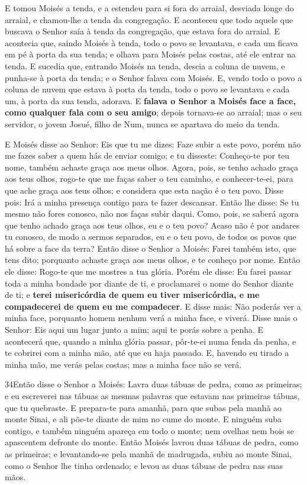 E tomou Moisés a tenda, e a estendeu para si fora do arraial,
desviada longe do arraial, e chamou-lhe a tenda da congregação. E
aconteceu que todo aquele que buscava o Senhor saía à tenda da
congregação, que estava fora do arraial. E acontecia que, saindo
Moisés à tenda, todo o povo se levantava, e cada um ficava em pé à
porta da sua tenda; e olhava para Moisés pelas costas, até ele
entrar na tenda. E sucedia que, entrando Moisés na tenda, descia
a coluna de nuvem, e punha-se à porta da tenda; e o Senhor falava
com Moisés. E, vendo todo o povo a coluna de nuvem que estava
à porta da tenda, todo o povo se levantava e cada um, à porta da sua
tenda, adorava. E \textbf{falava o Senhor a Moisés face a
face, como qualquer fala com o seu amigo}; depois tornava-se ao
arraial; mas o seu servidor, o jovem Josué, filho de Num, nunca se
apartava do meio da tenda.

E Moisés disse ao Senhor: Eis que tu me dizes: Faze subir a este
povo, porém não me fazes saber a quem hás de enviar comigo; e tu
disseste: Conheço-te por teu nome, também achaste graça aos meus
olhos. Agora, pois, se tenho achado graça aos teus olhos,
rogo-te que me faças saber o teu caminho, e conhecer-te-ei, para que
ache graça aos teus olhos; e considera que esta nação é o teu povo.
Disse pois: Irá a minha presença contigo para te fazer
descansar. Então lhe disse: Se tu mesmo não fores conosco,
não nos faças subir daqui. Como, pois, se saberá agora que
tenho achado graça aos teus olhos, eu e o teu povo? Acaso não é por
andares tu conosco, de modo a sermos separados, eu e o teu povo, de
todos os povos que há sobre a face da terra? Então disse o
Senhor a Moisés: Farei também isto, que tens dito; porquanto achaste
graça aos meus olhos, e te conheço por nome. Então ele disse:
Rogo-te que me mostres a tua glória. Porém ele disse: Eu
farei passar toda a minha bondade por diante de ti, e proclamarei o
nome do Senhor diante de ti; e \textbf{terei misericórdia de quem eu
tiver misericórdia, e me compadecerei de quem eu me compadecer}.
E disse mais: Não poderás ver a minha face, porquanto homem
nenhum verá a minha face, e viverá. Disse mais o Senhor: Eis
aqui um lugar junto a mim; aqui te porás sobre a penha. E
acontecerá que, quando a minha glória passar, pôr-te-ei numa fenda
da penha, e te cobrirei com a minha mão, até que eu haja passado.
E, havendo eu tirado a minha mão, me verás pelas costas; mas
a minha face não se verá.

\medskip

\lettrine{34} Então disse o Senhor a Moisés: Lavra duas tábuas
de pedra, como as primeiras; e eu escreverei nas tábuas as mesmas
palavras que estavam nas primeiras tábuas, que tu quebraste. E
prepara-te para amanhã, para que subas pela manhã ao monte Sinai, e
ali põe-te diante de mim no cume do monte. E ninguém suba
contigo, e também ninguém apareça em todo o monte; nem ovelhas nem
bois se apascentem defronte do monte. Então Moisés lavrou duas
tábuas de pedra, como as primeiras; e levantando-se pela manhã de
madrugada, subiu ao monte Sinai, como o Senhor lhe tinha ordenado; e
levou as duas tábuas de pedra nas suas mãos.

